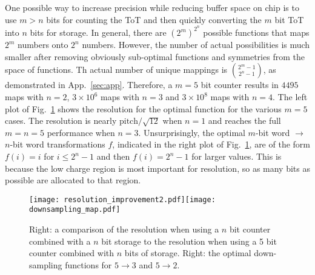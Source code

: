\documentclass[12pt]{article}
\begin{document}
One possible way to increase precision while reducing buffer space on chip is to use $m>n$ bits for counting the ToT and then quickly converting the $m$ bit ToT into $n$ bits for storage.  In general, there are $(2^m)^{2^n}$ possible functions that maps $2^m$ numbers onto $2^n$ numbers.  However, the number of actual possibilities is much smaller after removing obviously sub-optimal functions and symmetries from the space of functions.   Th actual number of unique mappings is ${2^m-1} \choose {2^n-1}$, as demonstrated in App.~\ref{sec:app}.  Therefore, a $m=5$ bit counter results in $4495$ maps with $n=2$, $3\times 10^6$ maps with $n=3$ and $3\times 10^8$ maps with $n=4$.  The left plot of Fig.~\ref{fig:resolution:nonlinear} shows the resolution for the optimal function for the various $m=5$ cases.  The resolution is nearly $\text{pitch}/\sqrt{12}$ when $n=1$ and reaches the full $m=n=5$ performance when $n=3$.  Unsurprisingly, the optimal $m$-bit word $\rightarrow$ $n$-bit word transformations $f$, indicated in  the right plot of Fig.~\ref{fig:resolution:nonlinear}, are of the form $f(i)=i$ for $i\leq 2^n-1$ and then $f(i)=2^n-1$ for larger values.  This is because the low charge region is most important for resolution, so as many bits as possible are allocated to that region.


\begin{figure}[h!]
\centering
\texttt{[image: resolution\_improvement2.pdf]}\texttt{[image: downsampling\_map.pdf]}
\caption{Right: a comparison of the resolution when using a $n$ bit counter combined with a $n$ bit storage to the resolution when using a 5 bit counter combined with $n$ bits of storage.  Right: the optimal down-sampling functions for $5\rightarrow 3$ and $5\rightarrow 2$. }
\label{fig:resolution:nonlinear}
\end{figure}
\end{document}
